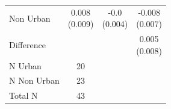 \begin{tabular}{l|ccc}
Non Urban & \makecell{0.008 \\ (0.009)\\[0.25em]} & \makecell{-0.0 \\ (0.004)\\[0.25em]} & \makecell{-0.008 \\ (0.007)\\[0.25em]} \\
Difference &  &  & \makecell{0.005 \\ (0.008)\\[0.25em]} \\
\midrule
N Urban & 20 \\
N Non Urban & 23 \\
Total N & 43 \\
\bottomrule
\end{tabular}
